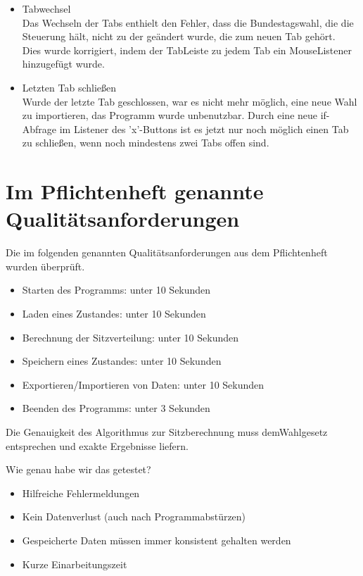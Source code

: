 \documentclass[12pt,a4paper,titlepage]{article}
\begin{document}
\begin{itemize}
\item Tabwechsel\\
Das Wechseln der Tabs enthielt den Fehler, dass die Bundestagswahl, die die Steuerung hält, nicht zu der geändert wurde, die zum neuen Tab gehört.\\
Dies wurde korrigiert, indem der TabLeiste zu jedem Tab ein MouseListener hinzugefügt wurde.\\

\item Letzten Tab schließen\\
Wurde der letzte Tab geschlossen, war es nicht mehr möglich, eine neue Wahl zu importieren, das Programm wurde unbenutzbar. Durch eine neue if-Abfrage im Listener des 'x'-Buttons ist es jetzt nur noch möglich einen Tab zu schließen, wenn noch mindestens zwei Tabs offen sind. \\

\end{itemize}

\section{Im Pflichtenheft genannte Qualitätsanforderungen}
Die im folgenden genannten Qualitätsanforderungen aus dem Pflichtenheft wurden überprüft.

\begin{itemize}
\item Starten des Programms: unter 10 Sekunden
\item Laden eines Zustandes: unter 10 Sekunden
\item Berechnung der Sitzverteilung: unter 10 Sekunden
\item Speichern eines Zustandes: unter 10 Sekunden
\item Exportieren/Importieren von Daten: unter 10 Sekunden
\item Beenden des Programms: unter 3 Sekunden
\end{itemize}

Die Genauigkeit des Algorithmus zur Sitzberechnung muss demWahlgesetz entsprechen und exakte
Ergebnisse liefern.

Wie genau habe wir das getestet?
\\
\begin{itemize}
\item Hilfreiche Fehlermeldungen
\item Kein Datenverlust (auch nach Programmabstürzen)
\item Gespeicherte Daten müssen immer konsistent gehalten werden
\item Kurze Einarbeitungszeit
\end{itemize}
\end{document}
